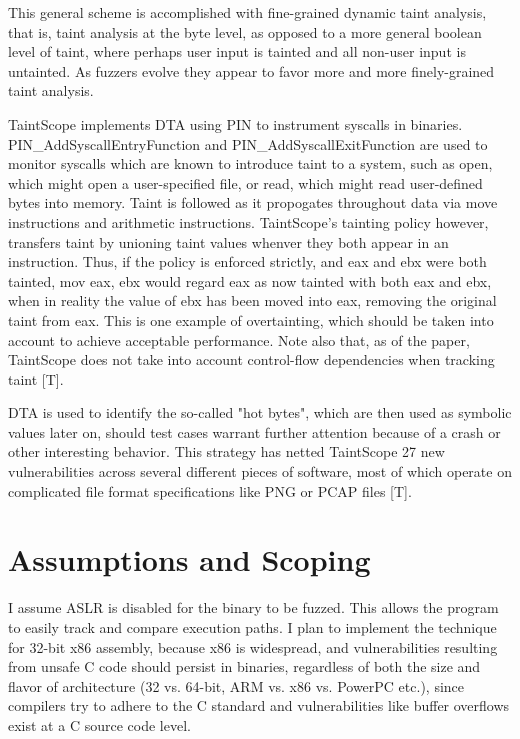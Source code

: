 \documentclass[11pt,expanded,copyright]{fsuthesis}
\begin{document}
This general scheme is accomplished with fine-grained dynamic taint analysis, that is, taint analysis at the byte level, as opposed to a more general boolean level of taint, where perhaps user input is tainted and all non-user input is untainted. As fuzzers evolve they appear to favor more and more finely-grained taint analysis.

TaintScope implements DTA using PIN to instrument syscalls in binaries. PIN\_AddSyscallEntryFunction and PIN\_AddSyscallExitFunction are used to monitor syscalls which are known to introduce taint to a system, such as open, which might open a user-specified file, or read, which might read user-defined bytes into memory. Taint is followed as it propogates throughout data via move instructions and arithmetic instructions. TaintScope's tainting policy however, transfers taint by unioning taint values whenver they both appear in an instruction. Thus, if the policy is enforced strictly, and eax and ebx were both tainted, mov eax, ebx would regard eax as now tainted with both eax and ebx, when in reality the value of ebx has been moved into eax, removing the original taint from eax. This is one example of overtainting, which should be taken into account to achieve acceptable performance. Note also that, as of the paper, TaintScope does not take into account control-flow dependencies when tracking taint [T].

DTA is used to identify the so-called "hot bytes", which are then used as symbolic values later on, should test cases warrant further attention because of a crash or other interesting behavior. This strategy has netted TaintScope 27 new vulnerabilities across several different pieces of software, most of which operate on complicated file format specifications like PNG or PCAP files [T].

\chapter{Assumptions and Scoping}

I assume ASLR is disabled for the binary to be fuzzed. This allows the program to easily track and compare execution paths. I plan to implement the technique for 32-bit x86 assembly, because x86 is widespread, and vulnerabilities resulting from unsafe C code should persist in binaries, regardless of both the size and flavor of architecture (32 vs. 64-bit, ARM vs. x86 vs. PowerPC etc.), since compilers try to adhere to the C standard and vulnerabilities like buffer overflows exist at a C source code level.
\end{document}
